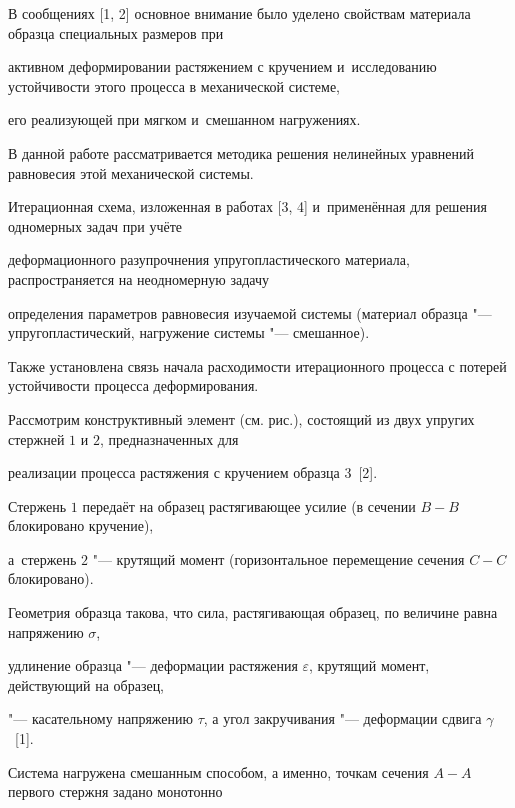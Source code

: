 \maketitle




В сообщениях [1, 2] основное внимание было уделено свойствам материала образца специальных размеров при

активном деформировании растяжением с кручением и~исследованию устойчивости этого процесса в механической системе,

его реализующей при мягком и~смешанном нагружениях.

В данной работе рассматривается методика решения нелинейных уравнений равновесия этой механической системы.

Итерационная схема, изложенная в работах [3, 4] и~применённая для решения одномерных задач при учёте

деформационного разупрочнения упругопластического материала, распространяется на неодномерную задачу

определения параметров равновесия изучаемой системы (материал образца "--- упругопластический, нагружение системы "--- смешанное).

Также установлена связь начала расходимости итерационного процесса с потерей устойчивости процесса деформирования.






Рассмотрим конструктивный элемент (см. рис.), состоящий из двух упругих стержней $1$ и $2$, предназначенных для

реализации процесса растяжения с кручением образца $3$~[2].

Стержень $1$ передаёт на образец растягивающее усилие (в сечении $B{-}B$ блокировано кручение),

а~стержень $2$ "--- крутящий момент (горизонтальное перемещение сечения $C{-}C$ блокировано).

Геометрия образца такова, что сила, растягивающая образец, по величине равна напряжению $\sigma$,

удлинение образца "--- деформации растяжения $\varepsilon$, крутящий момент, действующий на образец,

"--- касательному напряжению $\tau$, а угол закручивания "--- деформации сдвига $\gamma$~[1].

Система нагружена смешанным способом, а именно, точкам сечения ${A-}A$ первого стержня задано монотонно

